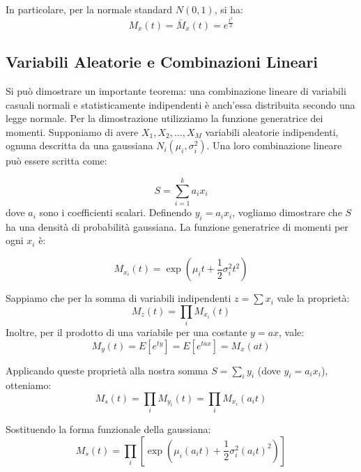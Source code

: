 \documentclass[openany,a4paper,12pt]{book}
\theoremstyle{remark}
\begin{document}
In particolare, per la normale standard $N(0,1)$, si ha:
\begin{equation}
M_x(t) = \bar{M}_x(t) = e^{\frac{t^2}{2}}
\end{equation}


\subsection*{Variabili Aleatorie e Combinazioni Lineari}

Si può dimostrare un importante teorema: una combinazione lineare di variabili casuali normali e statisticamente indipendenti è anch'essa distribuita secondo una legge normale.
Per la dimostrazione utilizziamo la funzione generatrice dei momenti. Supponiamo di avere $X_1, X_2, \dots, X_M$ variabili aleatorie indipendenti, ognuna descritta da una gaussiana $N_i(\mu_i, \sigma_i^2)$. Una loro combinazione lineare può essere scritta come:

\begin{equation}
S = \sum_{i=1}^{k} a_i x_i
\end{equation}
dove $a_i$ sono i coefficienti scalari.
Definendo $y_i= a_i x_i$, vogliamo dimostrare che $S$ ha una densità di probabilità gaussiana.
La funzione generatrice di momenti per ogni $x_i$ è:

\begin{equation}
M_{x_i}(t) = \exp \left( \mu_i t + \frac{1}{2} \sigma_i^2 t^2 \right)
\end{equation}

Sappiamo che per la somma di variabili indipendenti $z = \sum x_i$ vale la proprietà:
\begin{equation}
M_z(t) = \prod_{i} M_{x_i}(t)  
\end{equation}
Inoltre, per il prodotto di una variabile per una costante $y = ax$, vale:
\begin{equation}
M_y(t) = E[e^{t y}] = E[e^{tax}] = M_x(at) 
\end{equation}

Applicando queste proprietà alla nostra somma $S = \sum_{i} y_i$ (dove $y_i = a_i x_i$), otteniamo:
\begin{equation}
M_s(t) = \prod_{i} M_{y_i}(t) = \prod_{i} M_{x_i}(a_i t)
\end{equation}

Sostituendo la forma funzionale della gaussiana:
\begin{equation}
M_s(t) = \prod_{i} \left[ \exp \left( \mu_i (a_i t) + \frac{1}{2} \sigma_i^2 (a_i t)^2 \right) \right]
\end{equation}
\end{document}
